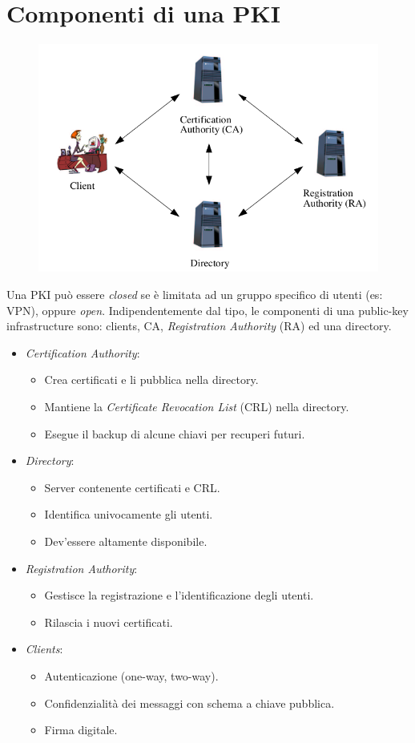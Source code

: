\documentclass[a4paper, 11pt, notitlepage, fleqn]{report}
\begin{document}
\section{Componenti di una PKI}
\begin{figure}[htp]
	\centering
	\includegraphics[width=.85\textwidth]{images/PKIComponents}
\end{figure}

\noindent Una PKI può essere \emph{closed} se è limitata ad un gruppo specifico di utenti (es: VPN), oppure \emph{open}. Indipendentemente dal tipo, le componenti di una public-key infrastructure sono: clients, CA, \emph{Registration Authority} (RA) ed una directory.
\begin{itemize}
	\item \emph{Certification Authority}:
	\begin{itemize}
		\item Crea certificati e li pubblica nella directory.
		\item Mantiene la \emph{Certificate Revocation List} (CRL) nella directory.
		\item Esegue il backup di alcune chiavi per recuperi futuri.
	\end{itemize}
	\item \emph{Directory}:
	\begin{itemize}
		\item Server contenente certificati e CRL.
		\item Identifica univocamente gli utenti.
		\item Dev'essere altamente disponibile.
	\end{itemize}
	\item \emph{Registration Authority}:
	\begin{itemize}
		\item Gestisce la registrazione e l'identificazione degli utenti.
		\item Rilascia i nuovi certificati.
	\end{itemize}
	\item \emph{Clients}:
	\begin{itemize}
		\item Autenticazione (one-way, two-way).
		\item Confidenzialità dei messaggi con schema a chiave pubblica.
		\item Firma digitale.
	\end{itemize}
\end{itemize}
\end{document}
